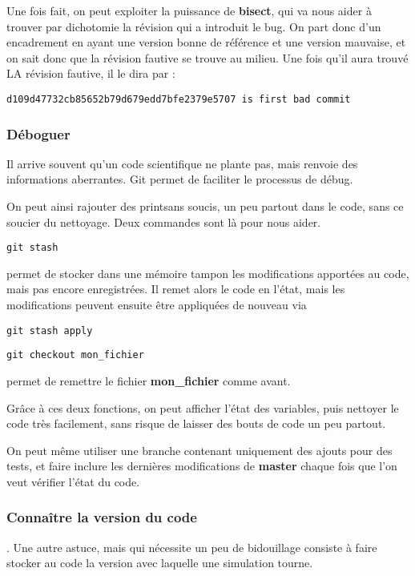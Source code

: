Une fois fait, on peut exploiter la puissance de \textbf{bisect}, qui va nous aider à trouver par dichotomie la révision qui a introduit le bug. On part donc d'un encadrement en ayant une version bonne de référence et une version mauvaise, et on sait donc que la révision fautive se trouve au milieu.
Une fois qu'il aura trouvé LA révision fautive, il le dira par :
\begin{verbatim}
d109d47732cb85652b79d679edd7bfe2379e5707 is first bad commit
\end{verbatim}


\subsubsection{Déboguer}
Il arrive souvent qu'un code scientifique ne plante pas, mais renvoie des informations aberrantes. Git permet de faciliter le processus de débug. 

On peut ainsi rajouter des \og print\fg sans soucis, un peu partout dans le code, sans ce soucier du nettoyage. Deux commandes sont là pour nous aider. 

\begin{verbatim}
git stash
\end{verbatim}
permet de stocker dans une mémoire tampon les modifications apportées au code, mais pas encore enregistrées. Il remet alors le code en l'état, mais les modifications peuvent ensuite être appliquées de nouveau via 
\begin{verbatim}
git stash apply
\end{verbatim}

\bigskip

\begin{verbatim}
git checkout mon_fichier
\end{verbatim}
permet de remettre le fichier \textbf{mon\_fichier} comme avant. 

\bigskip

Grâce à ces deux fonctions, on peut afficher l'état des variables, puis nettoyer le code très facilement, sans risque de laisser des bouts de code un peu partout. 

On peut même utiliser une branche contenant uniquement des ajouts pour des tests, et faire inclure les dernières modifications de \textbf{master} chaque fois que l'on veut vérifier l'état du code. 

\subsubsection{Connaître la version du code}. 
Une autre astuce, mais qui nécessite un peu de bidouillage consiste à faire stocker au code la version avec laquelle une simulation tourne. 

